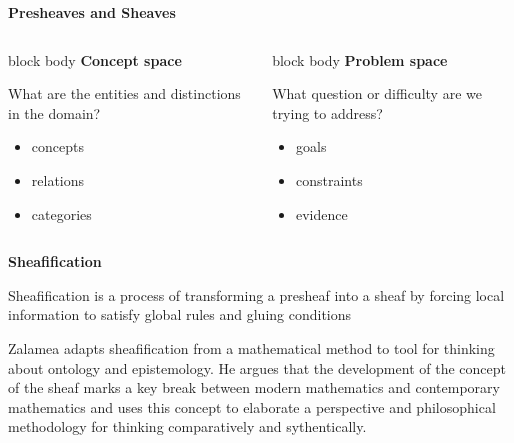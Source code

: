 \documentclass[aspectratio=169]{beamer}
\newcommand{\slideheading}[1]{%
    {\small\bfseries\color{slideMuted}#1\par}
    \vspace{1em}
}
\begin{document}
\begin{frame}
\slideheading{Presheaves and Sheaves}	
\begin{columns}[T,onlytextwidth]
        \begin{beamercolorbox}[wd=\linewidth,sep=0pt]{block body}
            {\large\bfseries\color{slideBlue}Concept space}\par
            \vspace{0.5em}
            What are the entities and distinctions in the domain?
            \begin{itemize}
                \item concepts
                \item relations
                \item categories
            \end{itemize}
        \end{beamercolorbox}
        \begin{beamercolorbox}[wd=\linewidth,sep=0pt]{block body}
            {\large\bfseries\color{slideBlue}Problem space}\par
            \vspace{0.5em}
            What question or difficulty are we trying to address?
            \begin{itemize}
                \item goals
                \item constraints
                \item evidence
            \end{itemize}
        \end{beamercolorbox}
    \end{columns}
\end{frame}


\begin{frame}
	\slideheading{Sheafification}
	Sheafification is a process of transforming a presheaf into a sheaf by forcing local information to satisfy global rules and gluing conditions
	
	
\end{frame}
\begin{frame}
	Zalamea adapts sheafification from a mathematical method to tool for thinking about ontology and epistemology. He argues that the development of the concept of the sheaf marks a key break between modern mathematics and contemporary mathematics and uses this concept to elaborate a perspective and philosophical methodology for thinking comparatively and sythentically.
\end{frame}
\end{document}
